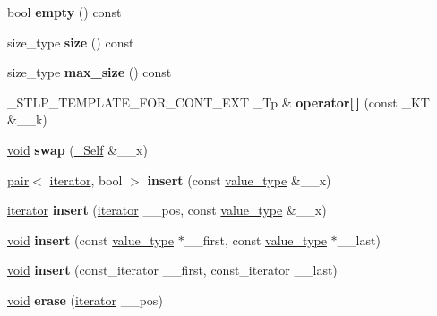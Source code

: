 \begin{DoxyCompactItemize}
bool {\bfseries empty} () const
\item 
\mbox{\label{classmap_a8baa923ccc10533d4539136cb41c8a5c}} 
size\+\_\+type {\bfseries size} () const
\item 
\mbox{\label{classmap_a2e52b243d83a28c0d80b0c1a3a5d3a7c}} 
size\+\_\+type {\bfseries max\+\_\+size} () const
\item 
\mbox{\label{classmap_aceca760fc14410067a63321775623bea}} 
\+\_\+\+S\+T\+L\+P\+\_\+\+T\+E\+M\+P\+L\+A\+T\+E\+\_\+\+F\+O\+R\+\_\+\+C\+O\+N\+T\+\_\+\+E\+XT \+\_\+\+Tp \& {\bfseries operator\mbox{[}$\,$\mbox{]}} (const \+\_\+\+KT \&\+\_\+\+\_\+k)
\item 
\mbox{\label{classmap_a0fb69a4bda0dfb652b58d73a9f2a909a}} 
\hyperlink{interfacevoid}{void} {\bfseries swap} (\hyperlink{classmap}{\+\_\+\+Self} \&\+\_\+\+\_\+x)
\item 
\mbox{\label{classmap_a77780ffbf696d839ae0654b80a7c37e9}} 
\hyperlink{structpair}{pair}$<$ \hyperlink{structiterator}{iterator}, bool $>$ {\bfseries insert} (const \hyperlink{structpair}{value\+\_\+type} \&\+\_\+\+\_\+x)
\item 
\mbox{\label{classmap_a6532a1338a7483729485b21190f5bbd1}} 
\hyperlink{structiterator}{iterator} {\bfseries insert} (\hyperlink{structiterator}{iterator} \+\_\+\+\_\+pos, const \hyperlink{structpair}{value\+\_\+type} \&\+\_\+\+\_\+x)
\item 
\mbox{\label{classmap_aaa284d26b43e1714dded9d3129192041}} 
\hyperlink{interfacevoid}{void} {\bfseries insert} (const \hyperlink{structpair}{value\+\_\+type} $\ast$\+\_\+\+\_\+first, const \hyperlink{structpair}{value\+\_\+type} $\ast$\+\_\+\+\_\+last)
\item 
\mbox{\label{classmap_ab67843813f576072d67dbf57ac3d6299}} 
\hyperlink{interfacevoid}{void} {\bfseries insert} (const\+\_\+iterator \+\_\+\+\_\+first, const\+\_\+iterator \+\_\+\+\_\+last)
\item 
\mbox{\label{classmap_accdeb73f5daa7eaceedad17e354cbf99}} 
\hyperlink{interfacevoid}{void} {\bfseries erase} (\hyperlink{structiterator}{iterator} \+\_\+\+\_\+pos)

\end{DoxyCompactItemize}
